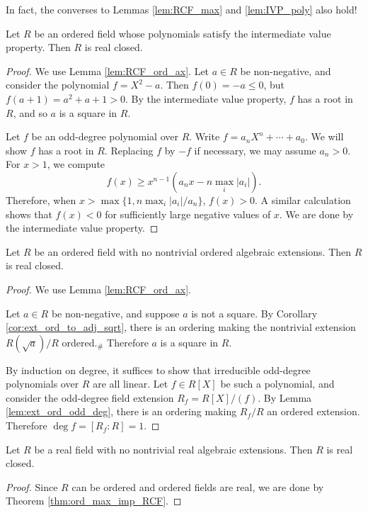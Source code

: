 In fact, the converses to Lemmas \ref{lem:RCF_max} and \ref{lem:IVP_poly} also hold!

\begin{theorem}
  \label{thm:IVP_poly_imp_RCF}
  Let $R$ be an ordered field whose polynomials satisfy the intermediate value property. Then $R$ is real closed.
\end{theorem}
\begin{proof}
  We use Lemma \ref{lem:RCF_ord_ax}. Let $a\in R$ be non-negative, and consider the polynomial $f=X^2-a$. Then $f(0)=-a\leq0$, but $f(a+1)=a^2+a+1>0$. By the intermediate value property, $f$ has a root in $R$, and so $a$ is a square in $R$.

  Let $f$ be an odd-degree polynomial over $R$. Write $f=a_nX^n+\cdots+a_0$. We will show $f$ has a root in $R$. Replacing $f$ by $-f$ if necessary, we may assume $a_n>0$. For $x>1$, we compute
  \[f(x)\geq x^{n-1}(a_nx-n\max_i|a_i|).\]
  Therefore, when $x>\max\{1,n\max_i|a_i|/a_n\}$, $f(x)>0$. A similar calculation shows that $f(x)<0$ for sufficiently large negative values of $x$. We are done by the intermediate value property.
\end{proof}

\begin{theorem}
  \label{thm:ord_max_imp_RCF}
  Let $R$ be an ordered field with no nontrivial ordered algebraic extensions. Then $R$ is real closed.
\end{theorem}
\begin{proof}
  We use Lemma \ref{lem:RCF_ord_ax}. 

  Let $a\in R$ be non-negative, and suppose $a$ is not a square. By Corollary \ref{cor:ext_ord_to_adj_sqrt}, there is an ordering making the nontrivial extension $R(\sqrt{a})/R$ ordered.$_\#$ Therefore $a$ is a square in $R$.

  By induction on degree, it suffices to show that irreducible odd-degree polynomials over $R$ are all linear. Let $f\in R[X]$ be such a polynomial, and consider the odd-degree field extension $R_f=R[X]/(f)$. By Lemma \ref{lem:ext_ord_odd_deg}, there is an ordering making $R_f/R$ an ordered extension. Therefore $\deg f=[R_f:R]=1$.
\end{proof}

\begin{corollary}
  \label{cor:real_max_imp_RCF}
  Let $R$ be a real field with no nontrivial real algebraic extensions. Then $R$ is real closed.
\end{corollary}
\begin{proof}
  Since $R$ can be ordered and ordered fields are real, we are done by Theorem \ref{thm:ord_max_imp_RCF}.
\end{proof}

